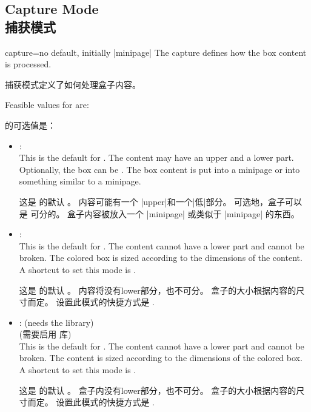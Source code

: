 \setcounter{section}{4}
\setcounter{subsection}{16}
\setcounter{subsubsection}{0}

\subsection{Capture Mode\\捕获模式}\label{subsec:capture}
\begin{docTcbKey}{capture}{=}{no default, initially |minipage|}
The capture  defines how the box content is processed.

捕获模式定义了如何处理盒子内容。

Feasible values for  are:

 的可选值是：
\begin{itemize}
\item{}:\\
  This is the default  for .
  The content may have an upper and a lower part. 
  Optionally, the box
  can be . The box content is put into a
  minipage or into something similar to a minipage.

这是  的默认  。%
内容可能有一个 |upper|和一个|低|部分。%
可选地，盒子可以是  可分的。
盒子内容被放入一个 |minipage| 或类似于 |minipage| 的东西。
\item{}:\\
  This is the default  for . The content cannot have
  a lower part and cannot be broken. The colored box is sized according
  to the dimensions of the content.
  A shortcut to set this mode is .

这是  的默认  。%
内容将没有lower部分，也不可分。%
盒子的大小根据内容的尺寸而定。%
设置此模式的快捷方式是 .
\item{}:%
 (needs the  library)\\

 (需要启用  库)\\
 
 This is the default  for . The content cannot have
  a lower part and cannot be broken.
  The content is sized according to the dimensions of the colored box.
  A shortcut to set this mode is .

这是  的默认 。 %
盒子内没有lower部分，也不可分。
盒子的大小根据内容的尺寸而定。%
设置此模式的快捷方式是 .
\end{itemize}


\end{docTcbKey}
